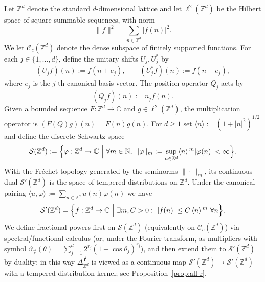 \documentclass[10pt]{amsart} %
\newcommand{\C}{{\mathbb{C}}}
\newcommand{\Z}{{\mathbb{Z}}}
\newcommand{\N}{{\mathbb{N}}}
\newcommand{\1}{{\mathbb{I}}}
\newcommand{\Cc}{\mathcal{C}}
\newcommand{\Sc}{\mathcal{S}}
\numberwithin{equation}{section}
\begin{document}
Let $\Z^d$ denote the standard \(d\)-dimensional lattice and let $\ell^2(\Z^d)$ be the Hilbert space of square-summable sequences, with norm
\[
\|f\|^2=\sum_{n\in\Z^{d}}|f(n)|^2.
\]
We let $\Cc_c(\Z^d)$ denote the dense subspace of finitely supported functions.
For each \(j\in\{1,\dots,d\}\), define the unitary shifts \(U_j,U_j^*\) by
\[
(U_j f)(n):=f(n+e_j),\qquad (U_j^* f)(n):=f(n-e_j),
\]
where \(e_j\) is the \(j\)-th canonical basis vector. The position operator \(Q_j\) acts by
\[
(Q_j f)(n):=n_j f(n).
\]
Given a bounded sequence $F:\Z^d\to\C$ and $g\in\ell^2(\Z^d)$, the multiplication operator is
$(F(Q)g)(n)=F(n)g(n)$.
For $d\ge1$ set $\langle n\rangle:=(1+|n|^2)^{1/2}$ and define the discrete Schwartz space
\[
\Sc(\Z^d):=\Bigl\{\varphi:\Z^d\to\C\ \Big|\ \forall m\in\N,\
\|\varphi\|_m:=\sup_{n\in\Z^d}\langle n\rangle^{\,m}|\varphi(n)|<\infty\Bigr\}.
\]
With the Fr\'echet topology generated by the seminorms $\|\cdot\|_m$, its continuous dual
$\Sc'(\Z^d)$ is the space of tempered distributions on $\Z^d$.
Under the canonical pairing $\langle u,\varphi\rangle:=\sum_{n\in\Z^d}u(n)\varphi(n)$ we have
\[
\Sc'(\Z^d)=\Bigl\{f:\Z^d\to\C\ \Big|\ \exists m,C>0:\ |f(n)|\le C\,\langle n\rangle^{\,m}\ \forall n\Bigr\}.
\]
We define fractional powers first on $\Sc(\Z^d)$ (equivalently on $\Cc_c(\Z^d)$) via spectral/functional calculus (or, under the Fourier transform, as multipliers with symbol $\vartheta_{\vec{\mathbf r}}(\theta)=\sum_{j=1}^d2^{r_j}(1-\cos\theta_j)^{r_j}$), and then extend them to $\Sc'(\Z^d)$ by duality; in this way $\Delta^{\vec{\mathbf r}}_{\Z^d}$ is viewed as a continuous map $\Sc'(\Z^d)\!\to\!\Sc'(\Z^d)$ with a tempered-distribution kernel; see Proposition~\ref{prop:all-r}.
\end{document}
